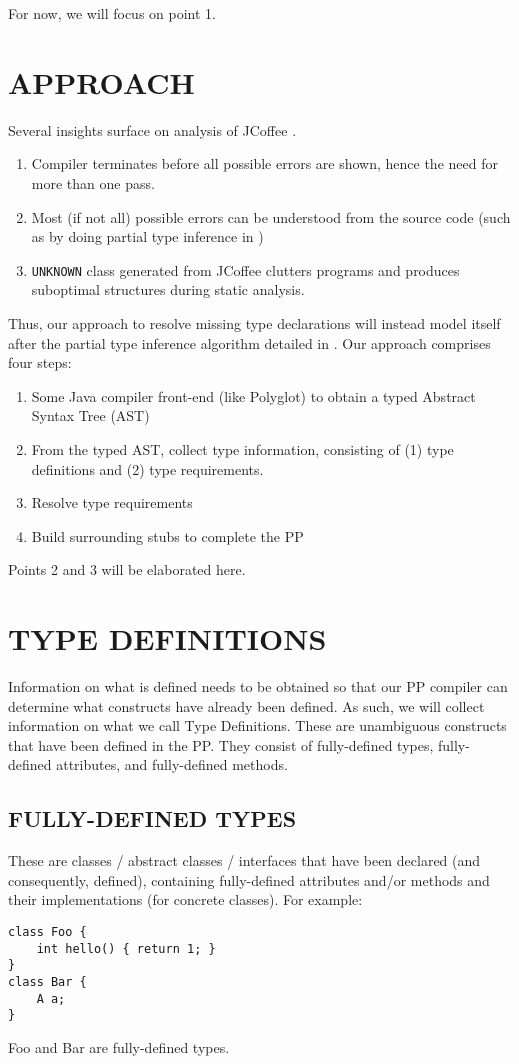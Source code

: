 \documentclass{article}
\begin{document}
For now, we will focus on point 1.

\section{APPROACH}
Several insights surface on analysis of JCoffee \cite{jcoffee20}.
\begin{enumerate}
    \item Compiler terminates before all possible errors are shown, hence the need for 
            more than one pass.
    \item Most (if not all) possible errors can be understood from the source code (such
            as by doing partial type inference in \cite{dagenais08})
    \item \texttt{UNKNOWN} class generated from JCoffee clutters programs and produces
            suboptimal structures during static analysis.
\end{enumerate}

Thus, our approach to resolve missing type declarations will instead model
itself after the partial type inference algorithm detailed in \cite{dagenais08}.
Our approach comprises four steps:
\begin{enumerate}
    \item Some Java compiler front-end (like Polyglot) to obtain a typed Abstract Syntax Tree (AST)
    \item From the typed AST, collect type information, consisting of
            (1) type definitions and (2) type requirements.
    \item Resolve type requirements
    \item Build surrounding stubs to complete the PP
\end{enumerate}

Points 2 and 3 will be elaborated here.

\section{TYPE DEFINITIONS}
Information on what is defined needs to be obtained so that our PP compiler can 
determine what constructs have already been defined. As such, we will
collect information on what we call Type Definitions.
These are unambiguous constructs that have been defined in the PP. 
They consist of fully-defined types, fully-defined attributes, and fully-defined
methods.
\subsection{FULLY-DEFINED TYPES}
These are classes / abstract classes / interfaces that have been declared (and consequently, defined),
containing fully-defined attributes and/or methods and their implementations (for concrete classes).
For example:
\begin{verbatim}
class Foo {
    int hello() { return 1; }
}
class Bar {
    A a;
}
\end{verbatim}
Foo and Bar are fully-defined types.
\end{document}
